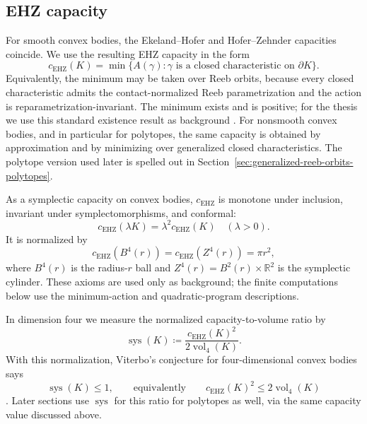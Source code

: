 \subsection{EHZ capacity}\label{subsec:preliminaries-smooth-symplectic-geometry}

For smooth convex bodies, the Ekeland--Hofer and Hofer--Zehnder capacities
coincide. We use the resulting EHZ capacity in the form
\begin{equation}\label{eq:preliminaries-ehz-capacity}
  c_{\mathrm{EHZ}}(K)
  = \min\{A(\gamma):\gamma
    \text{ is a closed characteristic on }\partial K\}.
\end{equation}
Equivalently, the minimum may be taken over Reeb orbits, because every closed
characteristic admits the contact-normalized Reeb parametrization and the
action is reparametrization-invariant. The minimum exists and is positive; for
the thesis we use this standard existence result as background
\cite{Rabinowitz1978}. For nonsmooth convex bodies, and in particular for
polytopes, the same capacity is obtained by approximation and by minimizing
over generalized closed characteristics. The polytope version used later is
spelled out in Section~\ref{sec:generalized-reeb-orbits-polytopes}.

As a symplectic capacity on convex bodies, \(c_{\mathrm{EHZ}}\) is monotone
under inclusion, invariant under symplectomorphisms, and conformal:
\[
  c_{\mathrm{EHZ}}(\lambda K)=\lambda^2c_{\mathrm{EHZ}}(K)
  \quad(\lambda>0).
\]
It is normalized by
\[
  c_{\mathrm{EHZ}}(B^4(r))=c_{\mathrm{EHZ}}(Z^4(r))=\pi r^2,
\]
where \(B^4(r)\) is the radius-\(r\) ball and
\(Z^4(r)=B^2(r)\times\mathbb{R}^2\) is the symplectic cylinder. These axioms
are used only as background; the finite computations below use the
minimum-action and quadratic-program descriptions.

In dimension four we measure the normalized capacity-to-volume ratio by
\begin{equation}\label{eq:preliminaries-systolic-ratio}
  \operatorname{sys}(K)
  \coloneqq
  \frac{c_{\mathrm{EHZ}}(K)^2}{2\operatorname{vol}_4(K)}.
\end{equation}
With this normalization, Viterbo's conjecture for four-dimensional convex
bodies says
\[
  \operatorname{sys}(K)\leq 1,
  \qquad\text{equivalently}\qquad
  c_{\mathrm{EHZ}}(K)^2\leq 2\operatorname{vol}_4(K)
\]
\cite{Viterbo2000}. Later sections use
\(\operatorname{sys}\) for this ratio for polytopes as well, via the same
capacity value discussed above.

